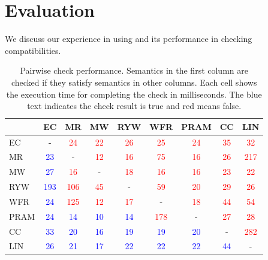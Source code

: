 \section{Evaluation} \label{sec:eval}

We discuss our experience in using \sysname{} and
its performance in checking compatibilities.

\newcommand{\tableT}{\textcolor{blue}{T}}
\newcommand{\tableF}{\textcolor{red}{F}}
\newcommand{\tableNA}{-}
\begin{table}
	\vspace{-0.15in}
  \centering
  \small
  \begin{tabular}{|l|c|c|c|c|c|c|c|c|}
    \hline
    {} &
    EC &
    MR &
    MW &
    RYW &
    WFR &
    PRAM &
    CC &
    LIN \\
    \hline
    EC   & \tableNA & \textcolor{red}{24} & \textcolor{red}{22} &
    \textcolor{red}{26} & \textcolor{red}{25} & \textcolor{red}{24} &
    \textcolor{red}{35} & \textcolor{red}{32} \\
    MR   & \textcolor{blue}{23} & \tableNA & \textcolor{red}{12} &
    \textcolor{red}{16} & \textcolor{red}{75} & \textcolor{red}{16} &
    \textcolor{red}{26} & \textcolor{red}{217} \\
    MW   & \textcolor{blue}{27} & \textcolor{red}{16} & \tableNA &
    \textcolor{red}{18} & \textcolor{red}{16} & \textcolor{red}{16} &
    \textcolor{red}{23} & \textcolor{red}{22} \\
    RYW  & \textcolor{blue}{193} & \textcolor{red}{106} &
    \textcolor{red}{45} & \tableNA & \textcolor{red}{59} &
    \textcolor{red}{20} & \textcolor{red}{29} & \textcolor{red}{26} \\
    WFR  & \textcolor{blue}{24} & \textcolor{red}{125} &
    \textcolor{red}{12} & \textcolor{red}{17} & \tableNA &
    \textcolor{red}{18} & \textcolor{red}{44} & \textcolor{red}{54} \\
    PRAM & \textcolor{blue}{24} & \textcolor{blue}{14} &
    \textcolor{blue}{10} & \textcolor{blue}{14} &
    \textcolor{red}{178} & \tableNA & \textcolor{red}{27} &
    \textcolor{red}{28} \\
    CC   & \textcolor{blue}{33} & \textcolor{blue}{20} &
    \textcolor{blue}{16} & \textcolor{blue}{19} &
    \textcolor{blue}{19} & \textcolor{blue}{20} & \tableNA &
    \textcolor{red}{282} \\
    LIN  & \textcolor{blue}{26} & \textcolor{blue}{21} &
    \textcolor{blue}{17} & \textcolor{blue}{22} &
    \textcolor{blue}{22} & \textcolor{blue}{22} &
    \textcolor{blue}{44} & \tableNA \\
    \hline
  \end{tabular}
  \caption{Pairwise check performance. Semantics in the first column
    are checked if they satisfy semantics in other columns. Each cell
    shows the execution time for completing the check in milliseconds. The
  blue text indicates the check result is true and red means false. }
  \label{tab:pairwise-time}
\end{table}

